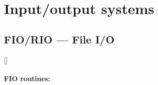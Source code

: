 \newpage

\section{Input/output systems}

\subsection{FIO/RIO --- File I/O} 
\label{R_FIO}

\vspace{-9mm}

\hfill []

\vspace{2mm}

\paragraph{FIO routines:}

